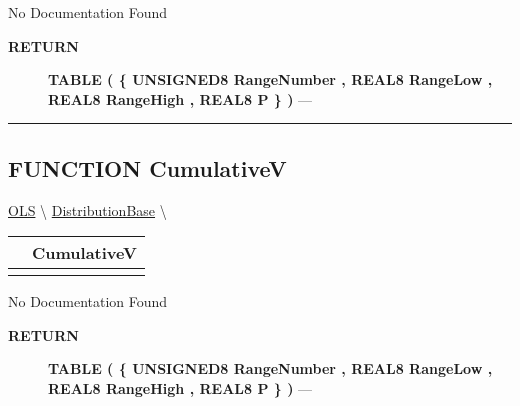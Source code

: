 \par





No Documentation Found








\par
\begin{description}
\item [\colorbox{tagtype}{\color{white} \textbf{\textsf{RETURN}}}] \textbf{TABLE ( \{ UNSIGNED8 RangeNumber , REAL8 RangeLow , REAL8 RangeHigh , REAL8 P \} )} --- 
\end{description}




\rule{\linewidth}{0.5pt}
\subsection*{\textsf{\colorbox{headtoc}{\color{white} FUNCTION}
CumulativeV}}

\hypertarget{ecldoc:linearregression.ols.distributionbase.cumulativev}{}
\hspace{0pt} \hyperlink{ecldoc:linearregression.ols}{OLS} \textbackslash 
\hspace{0pt} \hyperlink{ecldoc:linearregression.ols.distributionbase}{DistributionBase} \textbackslash 

{\renewcommand{\arraystretch}{1.5}
\begin{tabularx}{\textwidth}{|>{\raggedright\arraybackslash}l|X|}
\hline
\hspace{0pt}\mytexttt{\color{red} } & \textbf{CumulativeV} \\
\hline
\multicolumn{2}{|>{\raggedright\arraybackslash}X|}{\hspace{0pt}\mytexttt{\color{param} ()}} \\
\hline
\end{tabularx}
}

\par





No Documentation Found








\par
\begin{description}
\item [\colorbox{tagtype}{\color{white} \textbf{\textsf{RETURN}}}] \textbf{TABLE ( \{ UNSIGNED8 RangeNumber , REAL8 RangeLow , REAL8 RangeHigh , REAL8 P \} )} --- 
\end{description}




